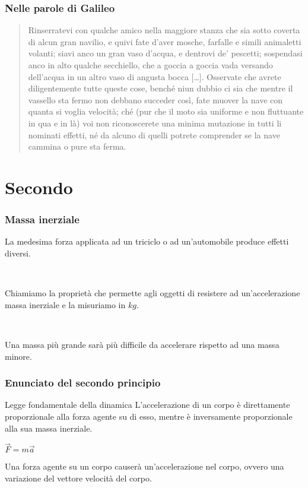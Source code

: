 \documentclass[]{beamer}
\theoremstyle{plain}
\begin{document}
\begin{frame}
  \frametitle{Nelle parole di Galileo}
  \begin{quote}
    Rinserratevi con qualche amico nella maggiore stanza che sia sotto coverta di alcun gran navilio, e quivi fate d’aver mosche, farfalle e simili animaletti volanti; siavi anco un gran vaso d’acqua, e dentrovi de’ pescetti; sospendasi anco in alto qualche secchiello, che a goccia a goccia vada versando dell’acqua in un altro vaso di angusta bocca [\ldots]. Osservate che avrete diligentemente tutte queste cose, benché niun dubbio ci sia che mentre il vassello sta fermo non debbano succeder così, fate muover la nave con quanta si voglia velocità; ché (pur che il moto sia uniforme e non fluttuante in qua e in là) voi non riconoscerete una minima mutazione in tutti li nominati effetti, né da alcuno di quelli potrete comprender se la nave cammina o pure sta ferma.
  \end{quote}
\end{frame}


\section{Secondo}


\begin{frame}
\frametitle{Massa inerziale}
La medesima forza applicata ad un triciclo o ad un'automobile produce effetti diversi.\pause

~

Chiamiamo la proprietà che permette agli oggetti di resistere ad un'accelerazione \alert{massa inerziale} e la misuriamo in $ kg $.\pause

~

Una massa più grande sarà più difficile da accelerare rispetto ad una massa minore.
\end{frame}


\begin{frame}
  \frametitle{Enunciato del secondo principio}
\begin{block}{Legge fondamentale della dinamica}
L'accelerazione di un corpo è direttamente proporzionale alla forza agente su di esso, mentre è inversamente proporzionale alla sua massa inerziale.\pause
\begin{center}
\colorbox{marroncino!30}{$ \vec{F} = m \vec{a} $}
\end{center}
\end{block}
\pause
Una forza agente su un corpo causerà un'accelerazione nel corpo, ovvero una \alert<3>{variazione del vettore velocità} del corpo.
\end{frame}
\end{document}
